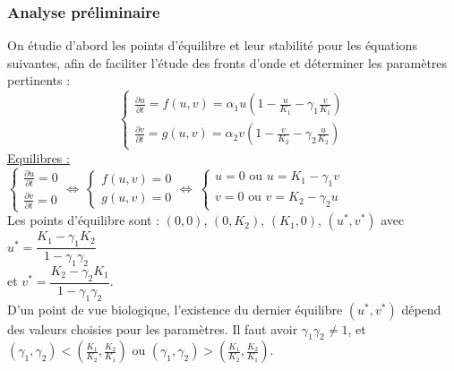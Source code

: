 \documentclass[a4paper,11pt]{article}
\begin{document}
\subsubsection{Analyse préliminaire}
On étudie d'abord les points d'équilibre et leur stabilité pour les équations suivantes, afin de faciliter l'étude des fronts d'onde et déterminer les paramètres pertinents :
$$\begin{cases}
\frac{\partial u}{\partial t} = f(u,v) = \alpha_1 u\left(1-\frac{u}{K_1}-\gamma_1\frac{v}{K_1}\right)\\
\frac{\partial v}{\partial t} = g(u,v) = \alpha_2 v\left(1 - \frac{v}{K_2} - \gamma_2\frac{u}{K_2}\right)
\end{cases}$$
\noindent \underline{Equilibres :}\\

$\begin{cases}
\frac{\partial u}{\partial t} = 0\\
\frac{\partial v}{\partial t} = 0
\end{cases} \Leftrightarrow \
\begin{cases}
f(u,v)=0\\
g(u,v)=0
\end{cases} \Leftrightarrow \
\begin{cases}
u = 0 \text{ ou } u = K_1 - \gamma_1 v\\
v = 0 \text{ ou } v = K_2 - \gamma_2 u
\end{cases}$\\

\noindent Les points d'équilibre sont : $(0,0)$, $(0,K_2)$, $(K_1,0)$, $(u^*,v^*)$ avec 
$u^* = \dfrac{K_1 - \gamma_1 K_2}{1-\gamma_1 \gamma_2}$ \\
et $v^* = \dfrac{K_2 - \gamma_2 K_1}{1-\gamma_1 \gamma_2}$.\\ 

D'un point de vue biologique, l'existence du dernier équilibre $(u^*,v^*)$ dépend des valeurs choisies pour les paramètres. Il faut avoir $\gamma_1\gamma_2 \neq 1$, et $(\gamma_1,\gamma_2) < \left(\frac{K_1}{K_2},\frac{K_2}{K_1}\right)$ 
ou $(\gamma_1,\gamma_2) > \left(\frac{K_1}{K_2},\frac{K_2}{K_1}\right)$.\\
\end{document}
